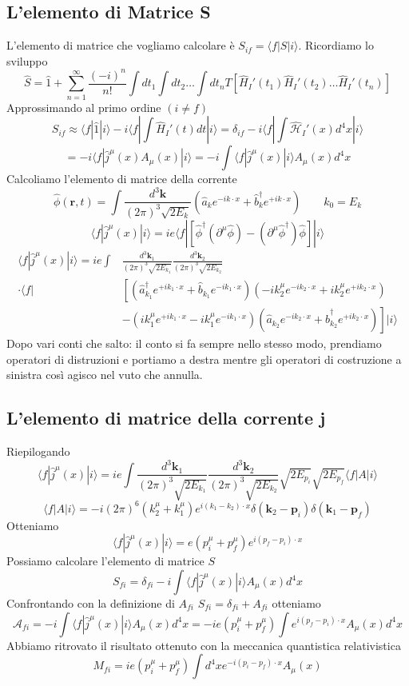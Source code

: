 \subsection{L'elemento di Matrice S}
L'elemento di matrice che vogliamo calcolare è $S_{if}=\langle f|S|i\rangle$. Ricordiamo lo sviluppo
$$
\hat{S} = \hat{1} + \sum_{n=1}^\infty \frac{(-i)^n}{n!} \int dt_1 \int dt_2 \dots \int dt_n T[\hat{H}_I'(t_1) \hat{H}_I'(t_2) \dots \hat{H}_I'(t_n)]
$$
Approssimando al primo ordine $(i\not=f)$
$$
S_{if} \approx \langle f | \hat{1} | i \rangle - i \langle f | \int \hat{H}_I'(t) dt | i \rangle = \delta_{if} - i \langle f | \int \hat{\mathcal{H}}_I'(x) d^4x | i \rangle
$$
$$
= - i \langle f | \hat{j}^\mu(x) A_\mu(x) | i \rangle = -i \int \langle f | \hat{j}^\mu(x) | i \rangle A_\mu(x) d^4x
$$
Calcoliamo l'elemento di matrice della corrente
$$
\hat{\phi}(\mathbf{r}, t) = \int \frac{d^3\mathbf{k}}{(2\pi)^3 \sqrt{2E_k}} \left( \hat{a}_k e^{-ik\cdot x} + \hat{b}_k^\dagger e^{+ik\cdot x} \right) \qquad k_0=E_k
$$
$$
\langle f | \hat{j}^\mu(x) | i \rangle = ie \langle f | \left[ \hat{\phi}^\dagger (\partial^\mu \hat{\phi}) - (\partial^\mu \hat{\phi}^\dagger) \hat{\phi} \right] | i \rangle
$$
\begin{align*}
\langle f | \hat{j}^\mu(x) | i \rangle = ie \int &\frac{d^3\mathbf{k}_1}{(2\pi)^3 \sqrt{2E_{k_1}}} \frac{d^3\mathbf{k}_2}{(2\pi)^3 \sqrt{2E_{k_2}}} \\
\cdot \Bigg\langle f \Bigg| &\left[ (\hat{a}_{k_1}^\dagger e^{+ik_1 \cdot x} + \hat{b}_{k_1} e^{-ik_1 \cdot x}) (-ik_2^\mu e^{-ik_2 \cdot x} + ik_2^\mu e^{+ik_2 \cdot x}) \right. \\
&\left. - (ik_1^\mu e^{+ik_1 \cdot x} - ik_1^\mu e^{-ik_1 \cdot x}) (\hat{a}_{k_2} e^{-ik_2 \cdot x} + \hat{b}_{k_2}^\dagger e^{+ik_2 \cdot x}) \right] \Bigg| i \Bigg\rangle
\end{align*}
Dopo vari conti che salto: il conto si fa sempre nello stesso modo, prendiamo operatori di distruzioni e portiamo a destra mentre gli operatori di costruzione a sinistra così agisco nel vuto che annulla.
\subsection{L'elemento di matrice della corrente j}
Riepilogando
$$
\langle f | \hat{j}^\mu(x) | i \rangle = ie \int \frac{d^3\mathbf{k}_1}{(2\pi)^3 \sqrt{2E_{k_1}}} \frac{d^3\mathbf{k}_2}{(2\pi)^3 \sqrt{2E_{k_2}}} \sqrt{2E_{p_i}} \sqrt{2E_{p_f}} \langle f | A | i \rangle
$$
$$
\langle f | A | i \rangle = -i(2\pi)^6 (k_2^\mu + k_1^\mu) e^{i(k_1-k_2) \cdot x} \delta(\mathbf{k}_2 - \mathbf{p}_i) \delta(\mathbf{k}_1 - \mathbf{p}_f)
$$
Otteniamo
$$
\langle f | \hat{j}^\mu(x) | i \rangle = e(p_i^\mu + p_f^\mu) e^{i(p_f - p_i) \cdot x}
$$
Possiamo calcolare l'elemento di matrice $S$
$$
S_{fi} = \delta_{fi} - i \int \langle f | \hat{j}^\mu(x) | i \rangle A_\mu(x) d^4x
$$
Confrontando con la definizione di $A_{fi}$ $S_{fi}=\delta_{fi}+A_{fi}$ otteniamo
$$
\mathcal{A}_{fi} = -i \int \langle f | \hat{j}^\mu(x) | i \rangle A_\mu(x) d^4x = -ie(p_i^\mu + p_f^\mu) \int e^{i(p_f - p_i) \cdot x} A_\mu(x) d^4x
$$
Abbiamo ritrovato il risultato ottenuto con la meccanica quantistica relativistica
$$
M_{fi} = ie(p_i^\mu + p_f^\mu) \int d^4x e^{-i(p_i - p_f) \cdot x} A_\mu(x)
$$
